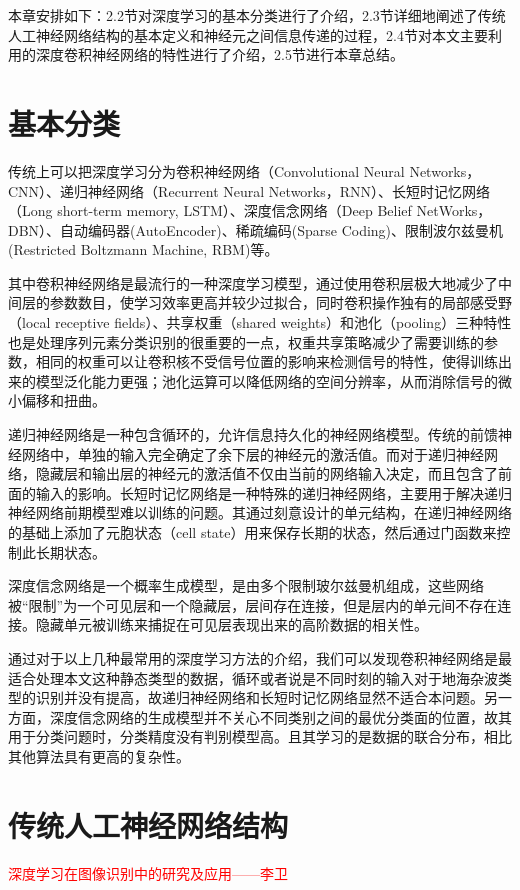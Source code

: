 本章安排如下：2.2节对深度学习的基本分类进行了介绍，2.3节详细地阐述了传统人工神经网络结构的基本定义和神经元之间信息传递的过程，2.4节对本文主要利用的深度卷积神经网络的特性进行了介绍，2.5节进行本章总结。


\section{基本分类}
传统上可以把深度学习分为卷积神经网络（Convolutional Neural Networks， CNN）、递归神经网络（Recurrent Neural Networks，RNN）、长短时记忆网络（Long short-term memory, LSTM）、深度信念网络（Deep Belief NetWorks，DBN）、自动编码器(AutoEncoder)、稀疏编码(Sparse Coding)、限制波尔兹曼机(Restricted Boltzmann Machine, RBM)等。

其中卷积神经网络是最流行的一种深度学习模型，通过使用卷积层极大地减少了中间层的参数数目，使学习效率更高并较少过拟合，同时卷积操作独有的局部感受野（local receptive fields）、共享权重（shared weights）和池化（pooling）三种特性也是处理序列元素分类识别的很重要的一点，权重共享策略减少了需要训练的参数，相同的权重可以让卷积核不受信号位置的影响来检测信号的特性，使得训练出来的模型泛化能力更强；池化运算可以降低网络的空间分辨率，从而消除信号的微小偏移和扭曲。

递归神经网络是一种包含循环的，允许信息持久化的神经网络模型。传统的前馈神经网络中，单独的输入完全确定了余下层的神经元的激活值。而对于递归神经网络，隐藏层和输出层的神经元的激活值不仅由当前的网络输入决定，而且包含了前面的输入的影响。长短时记忆网络是一种特殊的递归神经网络，主要用于解决递归神经网络前期模型难以训练的问题。其通过刻意设计的单元结构，在递归神经网络的基础上添加了元胞状态（cell state）用来保存长期的状态，然后通过门函数来控制此长期状态。

深度信念网络是一个概率生成模型，是由多个限制玻尔兹曼机组成，这些网络被“限制”为一个可见层和一个隐藏层，层间存在连接，但是层内的单元间不存在连接。隐藏单元被训练来捕捉在可见层表现出来的高阶数据的相关性。

通过对于以上几种最常用的深度学习方法的介绍，我们可以发现卷积神经网络是最适合处理本文这种静态类型的数据，循环或者说是不同时刻的输入对于地海杂波类型的识别并没有提高，故递归神经网络和长短时记忆网络显然不适合本问题。另一方面，深度信念网络的生成模型并不关心不同类别之间的最优分类面的位置，故其用于分类问题时，分类精度没有判别模型高。且其学习的是数据的联合分布，相比其他算法具有更高的复杂性。

\section{传统人工神经网络结构}
\textcolor{red}{深度学习在图像识别中的研究及应用——李卫}

